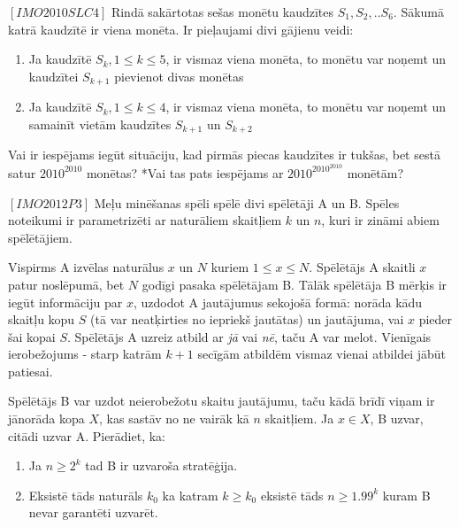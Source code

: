 \begin{problem}
$[IMO2010SLC4]$
Rindā sakārtotas sešas monētu kaudzītes $S_1, S_2 ,.. S_6$. Sākumā katrā kaudzītē ir viena monēta. Ir pieļaujami divi gājienu veidi:
\renewcommand{\theenumi}{\roman{enumi}}
\begin{enumerate}
\item Ja kaudzītē $S_k, 1\leq k \leq 5$, ir vismaz viena monēta, to monētu var noņemt un kaudzītei $S_{k+1}$ pievienot divas monētas
\item Ja kaudzītē $S_k, 1\leq k \leq 4$, ir vismaz viena monēta, to monētu var noņemt un samainīt vietām kaudzītes $S_{k+1}$ un $S_{k+2}$
\end{enumerate}
Vai ir iespējams iegūt situāciju, kad pirmās piecas kaudzītes ir tukšas, bet sestā satur $2010^{2010}$ monētas? *Vai tas pats iespējams ar $2010^{2010^{2010}}$ monētām?
\end{problem}
\filbreak
\begin{problem}
$[IMO2012P3]$
Meļu minēšanas spēli spēlē divi spēlētāji A un B. Spēles noteikumi ir parametrizēti ar naturāliem skaitļiem $k$ un $n$, kuri ir zināmi abiem spēlētājiem.

Vispirms A izvēlas naturālus $x$ un $N$ kuriem $1 \le x \le N$. Spēlētājs A skaitli $x$ patur noslēpumā, bet $N$ godīgi pasaka spēlētājam B. Tālāk spēlētāja B mērķis ir iegūt informāciju par $x$, uzdodot A jautājumus sekojošā formā: norāda kādu skaitļu kopu $S$ (tā var neatķirties no iepriekš jautātas) un jautājuma, vai $x$ pieder šai kopai $S$. Spēlētājs A uzreiz atbild ar \textit{jā} vai \textit{nē}, taču A var melot. Vienīgais ierobežojums - starp katrām $k+1$ secīgām atbildēm vismaz vienai atbildei jābūt patiesai.

Spēlētājs B var uzdot neierobežotu skaitu jautājumu, taču kādā brīdī viņam ir jānorāda kopa $X$, kas sastāv no ne vairāk kā $n$ skaitļiem. Ja  $x \in X$, B uzvar, citādi uzvar A. Pierādiet, ka:
\begin{enumerate}
\item Ja $n \ge 2^k$ tad B ir uzvaroša stratēģija.
\item Eksistē tāds naturāls $k_0$ ka katram $k \ge k_0$ eksistē tāds $n \ge 1.99^k$ kuram B nevar garantēti uzvarēt.
\end{enumerate}



\end{problem}


